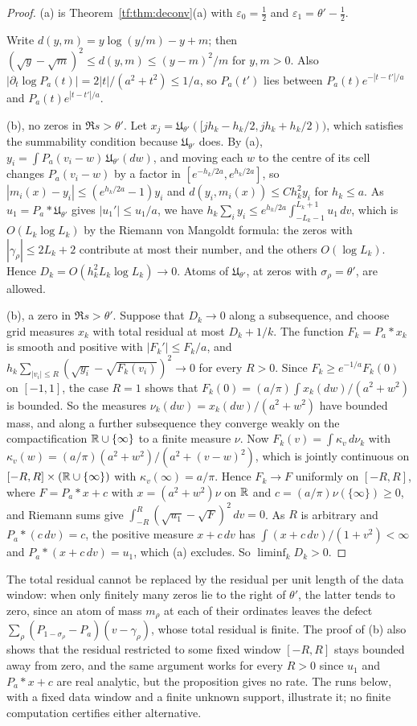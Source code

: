 \begin{proof}
(a) is Theorem~\ref{tf:thm:deconv}(a) with $\varepsilon_0=\tfrac12$ and $\varepsilon_1=\theta'-\tfrac12$.

Write $d(y,m)=y\log(y/m)-y+m$; then $(\sqrt y-\sqrt m)^2\le d(y,m)\le(y-m)^2/m$ for $y,m>0$. Also $|\partial_t\log P_a(t)|=2|t|/(a^2+t^2)\le1/a$, so $P_a(t')$ lies between $P_a(t)e^{-|t-t'|/a}$ and $P_a(t)e^{|t-t'|/a}$.

(b), no zeros in $\Re s>\theta'$. Let $x_j=\mathfrak U_{\theta'}([jh_k-h_k/2,jh_k+h_k/2))$, which satisfies the summability condition because $\mathfrak U_{\theta'}$ does. By (a), $y_i=\int P_a(v_i-w)\,\mathfrak U_{\theta'}(dw)$, and moving each $w$ to the centre of its cell changes $P_a(v_i-w)$ by a factor in $[e^{-h_k/2a},e^{h_k/2a}]$, so $|m_i(x)-y_i|\le(e^{h_k/2a}-1)y_i$ and $d(y_i,m_i(x))\le Ch_k^2y_i$ for $h_k\le a$. As $u_1=P_a*\mathfrak U_{\theta'}$ gives $|u_1'|\le u_1/a$, we have $h_k\sum_iy_i\le e^{h_k/2a}\int_{-L_k-1}^{L_k+1}u_1\,dv$, which is $O(L_k\log L_k)$ by the Riemann von Mangoldt formula: the zeros with $|\gamma_\rho|\le2L_k+2$ contribute at most their number, and the others $O(\log L_k)$. Hence $D_k=O(h_k^2L_k\log L_k)\to0$. Atoms of $\mathfrak U_{\theta'}$, at zeros with $\sigma_\rho=\theta'$, are allowed.

(b), a zero in $\Re s>\theta'$. Suppose that $D_k\to0$ along a subsequence, and choose grid measures $x_k$ with total residual at most $D_k+1/k$. The function $F_k=P_a*x_k$ is smooth and positive with $|F_k'|\le F_k/a$, and $h_k\sum_{|v_i|\le R}(\sqrt{y_i}-\sqrt{F_k(v_i)})^2\to0$ for every $R>0$. Since $F_k\ge e^{-1/a}F_k(0)$ on $[-1,1]$, the case $R=1$ shows that $F_k(0)=(a/\pi)\int x_k(dw)/(a^2+w^2)$ is bounded. So the measures $\nu_k(dw)=x_k(dw)/(a^2+w^2)$ have bounded mass, and along a further subsequence they converge weakly on the compactification $\mathbb{R}\cup\{\infty\}$ to a finite measure $\nu$. Now $F_k(v)=\int\kappa_v\,d\nu_k$ with $\kappa_v(w)=(a/\pi)(a^2+w^2)/(a^2+(v-w)^2)$, which is jointly continuous on $[-R,R]\times(\mathbb{R}\cup\{\infty\})$ with $\kappa_v(\infty)=a/\pi$. Hence $F_k\to F$ uniformly on $[-R,R]$, where $F=P_a*x+c$ with $x=(a^2+w^2)\nu$ on $\mathbb{R}$ and $c=(a/\pi)\nu(\{\infty\})\ge0$, and Riemann sums give $\int_{-R}^R(\sqrt{u_1}-\sqrt F)^2\,dv=0$. As $R$ is arbitrary and $P_a*(c\,dv)=c$, the positive measure $x+c\,dv$ has $\int(x+c\,dv)/(1+v^2)<\infty$ and $P_a*(x+c\,dv)=u_1$, which (a) excludes. So $\liminf_kD_k>0$.
\end{proof}

The total residual cannot be replaced by the residual per unit length of the data window: when only finitely many zeros lie to the right of $\theta'$, the latter tends to zero, since an atom of mass $m_\rho$ at each of their ordinates leaves the defect $\sum_\rho(P_{1-\sigma_\rho}-P_a)(v-\gamma_\rho)$, whose total residual is finite. The proof of (b) also shows that the residual restricted to some fixed window $[-R,R]$ stays bounded away from zero, and the same argument works for every $R>0$ since $u_1$ and $P_a*x+c$ are real analytic, but the proposition gives no rate. The runs below, with a fixed data window and a finite unknown support, illustrate it; no finite computation certifies either alternative.

